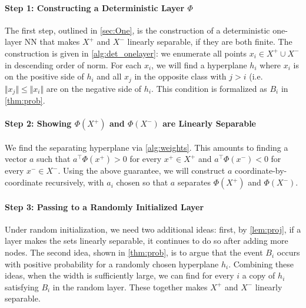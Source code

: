 \documentclass[aoap]{imsart}
\numberwithin{equation}{section}
\theoremstyle{definition}
\theoremstyle{remark}
\numberwithin{equation}{section}
\newcommand{\0}{\mathbf{0}}
\newcommand{\1}{\mathbf{1}}
\numberwithin{equation}{section}
\begin{document}
\paragraph{Step 1: Constructing a Deterministic Layer $\Phi$}
The first step, outlined in \cref{sec:One}, is the construction of a deterministic one-layer NN that makes $X^+$ and $X^-$ linearly separable, if they are both finite. The construction is given in \cref{alg:det_onelayer}: we enumerate all points $x_i\in X^+\cup X^-$ in descending order of norm. For each $x_i$, we will find a hyperplane $h_i$ where $x_i$ is on the positive side of $h_i$ and all $x_j$ in the opposite class with $j>i$ (i.e. $\Vert x_j\Vert \le\Vert x_i\Vert$ are on the negative side of $h_i$. This condition is formalized as $B_i$ in \cref{thm:prob}. %

\paragraph{Step 2: Showing $\Phi(X^+)$ and $\Phi(X^-)$ are Linearly Separable}

We find the separating hyperplane via \cref{alg:weights}. This amounts to finding a vector $a$ such that $a^{\intercal}\Phi(x^{+}) >0$ for every $x^{+}\in X^{+}$ and $a^{\intercal}\Phi(x^{-}) <0$ for every $x^{-}\in X^{-}$.  Using the above guarantee, we will construct $a$ coordinate-by-coordinate recursively, with $a_i$ chosen so that $a$ separates $\Phi(X^{+})$ and $\Phi (X^{-})$.

\paragraph{Step 3: Passing to a Randomly Initialized Layer}
Under random initialization, we need two additional ideas: first, by \cref{lem:proj}, if a layer makes the sets linearly separable, it continues to do so after adding more nodes. The second idea, shown in \cref{thm:prob}, is to argue that the event $B_i$ occurs with positive probability for a randomly chosen hyperplane $h_i$. %
Combining these ideas, when the width is sufficiently large, we can find for every $i$ a copy of $h_i$ satisfying $B_i$ in the random layer. These together makes $X^+$ and $X^-$ linearly separable.
\end{document}
